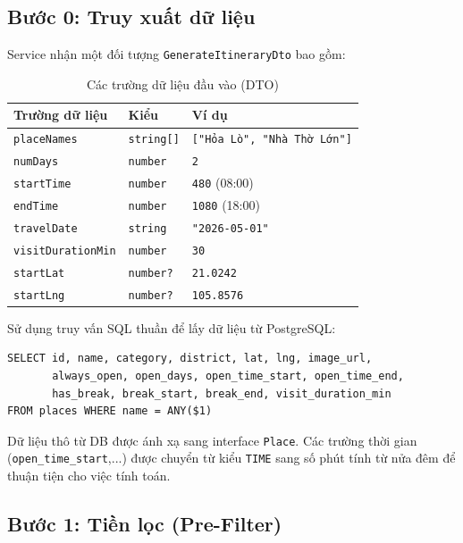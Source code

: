 \documentclass[12pt,a4paper]{report}
\begin{document}
\subsection{Bước 0: Truy xuất dữ liệu}

Service nhận một đối tượng \texttt{GenerateItineraryDto} bao gồm:

\begin{table}[H]
\centering
\begin{tabular}{|l|l|l|}
\hline
\textbf{Trường dữ liệu} & \textbf{Kiểu} & \textbf{Ví dụ} \\
\hline
\texttt{placeNames} & \texttt{string[]} & \texttt{["Hỏa Lò", "Nhà Thờ Lớn"]} \\
\texttt{numDays} & \texttt{number} & \texttt{2} \\
\texttt{startTime} & \texttt{number} & \texttt{480} (08:00) \\
\texttt{endTime} & \texttt{number} & \texttt{1080} (18:00) \\
\texttt{travelDate} & \texttt{string} & \texttt{"2026-05-01"} \\
\texttt{visitDurationMin} & \texttt{number} & \texttt{30} \\
\texttt{startLat} & \texttt{number?} & \texttt{21.0242} \\
\texttt{startLng} & \texttt{number?} & \texttt{105.8576} \\
\hline
\end{tabular}
\caption{Các trường dữ liệu đầu vào (DTO)}
\end{table}

Sử dụng truy vấn SQL thuần để lấy dữ liệu từ PostgreSQL:
\begin{verbatim}
SELECT id, name, category, district, lat, lng, image_url,
       always_open, open_days, open_time_start, open_time_end,
       has_break, break_start, break_end, visit_duration_min
FROM places WHERE name = ANY($1)
\end{verbatim}

Dữ liệu thô từ DB được ánh xạ sang interface \texttt{Place}. Các trường thời gian (\texttt{open\_time\_start},...) được chuyển từ kiểu \texttt{TIME} sang số phút tính từ nửa đêm để thuận tiện cho việc tính toán.

\subsection{Bước 1: Tiền lọc (Pre-Filter)}
\end{document}
